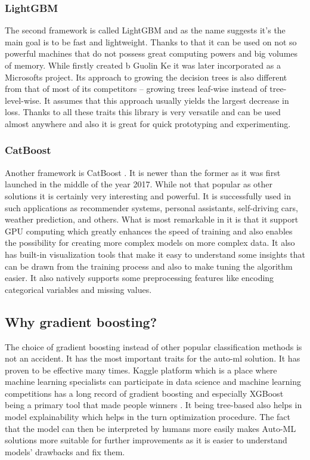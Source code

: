 \documentclass[a4paper,twoside,12pt]{book}
\begin{document}
\subsubsection{LightGBM}

The second framework is called LightGBM \cite{ke2017lightgbm} and as the name suggests it's the main goal is to be fast and lightweight. Thanks to that it can be used on not so powerful machines that do not possess great computing powers and big volumes of memory. While firstly created b Guolin Ke it was later incorporated as a Microsofts project. Its approach to growing the decision trees is also different from that of most of its competitors -- growing trees leaf-wise instead of tree-level-wise. It assumes that this approach usually yields the largest decrease in loss. Thanks to all these traits this library is very versatile and can be used almost anywhere and also it is great for quick prototyping and experimenting. 

\subsubsection{CatBoost}

Another framework is CatBoost \cite{prokhorenkova2018catboost}. It is newer than the former as it was first launched in the middle of the year 2017. While not that popular as other solutions it is certainly very interesting and powerful. It is successfully used in such applications as recommender systems, personal assistants, self-driving cars, weather prediction, and others. What is most remarkable in it is that it support GPU computing which greatly enhances the speed of training and also enables the possibility for creating more complex models on more complex data. It also has built-in visualization tools that make it easy to understand some insights that can be drawn from the training process and also to make tuning the algorithm easier. It also natively supports some preprocessing features like encoding categorical variables and missing values.

\subsection{Why gradient boosting?}

The choice of gradient boosting instead of other popular classification methods is not an accident. It has the most important traits for the auto-ml solution. It has proven to be effective many times. Kaggle \cite{bib:Kaggle} platform which is a place where machine learning specialists can participate in data science and machine learning competitions has a long record of gradient boosting and especially XGBoost being a primary tool that made people winners \cite{bib:Kaggle_survey}. 
It being tree-based also helps in model explainability which helps in the turn optimization procedure. The fact that the model can then be interpreted by humans more easily makes Auto-ML solutions more suitable for further improvements as it is easier to understand models' drawbacks and fix them.
\end{document}
